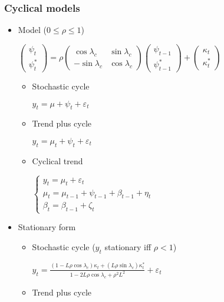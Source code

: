\documentclass[12pt]{article}
\theoremstyle{definition}
\theoremstyle{remark}
\numberwithin{equation}{section}
\begin{document}
\subsubsection{Cyclical models}
\begin{itemize}
	\item Model ($0\leq\rho\leq 1$)

	$\begin{pmatrix}
		\psi_{t}\\ \psi^*_{t}
	\end{pmatrix}=\rho
	\begin{pmatrix}
		\cos \lambda_c & \sin \lambda_c \\ -\sin \lambda_c & \cos \lambda_c
	\end{pmatrix}\begin{pmatrix}
		\psi_{t-1}\\ \psi^*_{t-1}
	\end{pmatrix}+\begin{pmatrix}
		\kappa_{t}\\ \kappa^*_{t}
	\end{pmatrix}$

		\begin{itemize}
			\item Stochastic cycle

			$y_t = \mu+\psi_t +\varepsilon_t$

			\item Trend plus cycle

			$y_t = \mu_t + \psi_t +\varepsilon_t$

			\item Cyclical trend

			$\begin{cases}
				y_t = \mu_t+\varepsilon_t\\
				\mu_t =  \mu_{t-1}+\psi_{t-1}+\beta_{t-1}+\eta_t\\
				\beta_t = \beta_{t-1}+\zeta_t
			\end{cases}$

		\end{itemize}
	\item Stationary form

	\begin{itemize}
		\item Stochastic cycle ($y_t$ stationary iff $\rho<1$)

		$\displaystyle y_t = \frac{(1-L\rho\cos\lambda_c)\kappa_t + (L\rho\sin\lambda_c)\kappa_t^*}{1-2L\rho\cos\lambda_c+\rho^2L^2}+\varepsilon_t$

		\item Trend plus cycle


\end{itemize}
\end{itemize}
\end{document}

